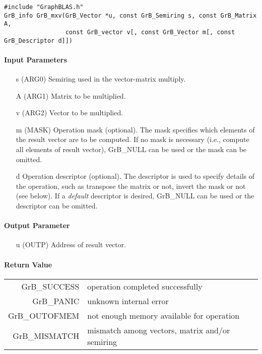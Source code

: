 \begin{verbatim}
#include "GraphBLAS.h"
GrB_info GrB_mxv(GrB_Vector *u, const GrB_Semiring s, const GrB_Matrix A, 
                 const GrB_vector v[, const GrB_Vector m[, const GrB_Descriptor d]])
\end{verbatim}

\paragraph{Input Parameters}

\begin{itemize}
	\item[{\sf s}] ({\sf ARG0}) Semiring used in the vector-matrix
	multiply.

	\item[{\sf A}] ({\sf ARG1}) Matrix to be multiplied.

	\item[{\sf v}] ({\sf ARG2}) Vector to be multiplied.

	\item[{\sf m}] ({\sf MASK}) Operation mask (optional). The mask
	specifies which elements of the result vector are to be computed.
	If no mask is necessary (i.e., compute all elements of result
	vector), {\sf GrB\_NULL} can be used or the mask can be omitted.

	\item[{\sf d}] Operation descriptor (optional). The descriptor
	is used to specify details of the operation, such as transpose
	the matrix or not, invert the mask or not (see below). If a
	\emph{default} descriptor is desired, {\sf GrB\_NULL} can be
	used or the descriptor can be omitted.
\end{itemize}

\paragraph{Output Parameter}

\begin{itemize}
	\item[{\sf u}] ({\sf OUTP}) Address of result vector.
\end{itemize}

\paragraph{Return Value}

\begin{tabular}{rl} 
{\sf GrB\_SUCCESS} 	& operation completed successfully \\
{\sf GrB\_PANIC}	& unknown internal error \\
{\sf GrB\_OUTOFMEM}	& not enough memory available for operation \\
{\sf GrB\_MISMATCH}	& mismatch among vectors, matrix and/or semiring
\end{tabular}

